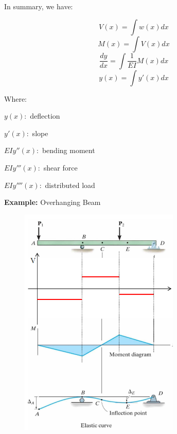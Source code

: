 \noindent In summary, we have:

\[V(x) = \int w(x) dx\]
\[M(x) = \int V(x)dx\]
\[\frac{dy}{dx} = \int \frac{1}{EI}M(x)dx\]
\[y(x) = \int y'(x) dx\]

\vspace{5pt}

\noindent Where:

\vspace{5pt}

\noindent $y(x):$ deflection

\vspace{5pt}

\noindent $y'(x):$ slope

\vspace{5pt}

\noindent $EIy''(x):$ bending moment

\vspace{5pt}

\noindent $EIy'''(x):$ shear force

\vspace{5pt}

\noindent $EIy''''(x):$ distributed load

\clearpage

\noindent \textbf{Example:} Overhanging Beam

\begin{figure}[!h]
\centering
\includegraphics[angle=0, width=3in]{Beam Deflection-Figures/Overhang Ex.png}
\vspace{-2mm}
\caption{\small {}}
\vspace{-3mm}
\label{Fig:OverhangEx}
\end{figure}

